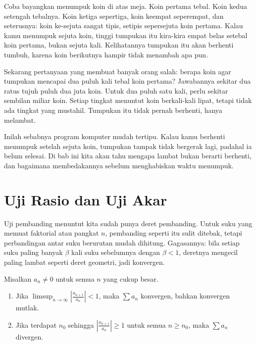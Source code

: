 \begin{untukanak}
Coba bayangkan menumpuk koin di atas meja. Koin pertama tebal. Koin kedua setengah
tebalnya. Koin ketiga sepertiga, koin keempat seperempat, dan seterusnya: koin
ke-sejuta sangat tipis, setipis sepersejuta koin pertama. Kalau kamu menumpuk sejuta
koin, tinggi tumpukan itu kira-kira empat belas setebal koin pertama, bukan sejuta
kali. Kelihatannya tumpukan itu akan berhenti tumbuh, karena koin berikutnya hampir
tidak menambah apa pun.

Sekarang pertanyaan yang membuat banyak orang salah: berapa koin agar tumpukan
mencapai dua puluh kali tebal koin pertama? Jawabannya sekitar dua ratus tujuh puluh
dua juta koin. Untuk dua puluh satu kali, perlu sekitar sembilan miliar koin. Setiap
tingkat menuntut koin berkali-kali lipat, tetapi tidak ada tingkat yang mustahil.
Tumpukan itu tidak pernah berhenti, hanya melambat.

Inilah sebabnya program komputer mudah tertipu. Kalau kamu berhenti menumpuk setelah
sejuta koin, tumpukan tampak tidak bergerak lagi, padahal ia belum selesai. Di bab ini
kita akan tahu mengapa lambat bukan berarti berhenti, dan bagaimana membedakannya
sebelum menghabiskan waktu menumpuk.
\end{untukanak}

\section{Uji Rasio dan Uji Akar}

Uji pembanding menuntut kita sudah punya deret pembanding. Untuk suku yang memuat
faktorial atau pangkat $n$, pembanding seperti itu sulit ditebak, tetapi perbandingan
antar suku berurutan mudah dihitung. Gagasannya: bila setiap suku paling banyak
$\beta$ kali suku sebelumnya dengan $\beta<1$, deretnya mengecil paling lambat seperti
deret geometri, jadi konvergen.

\begin{teorema}
Misalkan $a_n \neq 0$ untuk semua $n$ yang cukup besar.
\begin{enumerate}
\item Jika $\limsup_{n\to\infty} \left| \frac{a_{n+1}}{a_n} \right| < 1$, maka
      $\sum a_n$ konvergen, bahkan konvergen mutlak.
\item Jika terdapat $n_0$ sehingga $\left| \frac{a_{n+1}}{a_n} \right| \ge 1$ untuk
      semua $n \ge n_0$, maka $\sum a_n$ divergen.
\end{enumerate}
\end{teorema}


